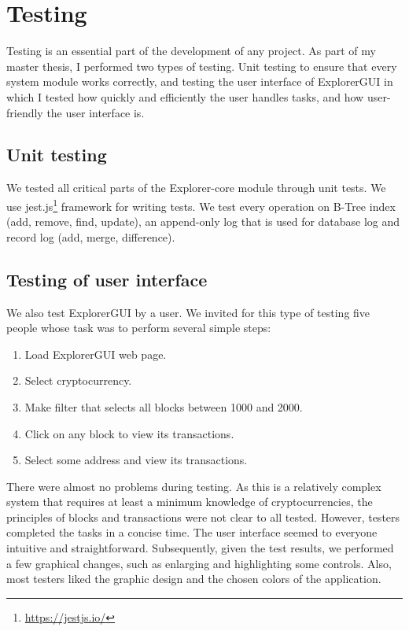 \chapter{Testing}
Testing is an essential part of the development of any project. As part of my master thesis, I performed two types of testing. Unit testing to ensure that every system module works correctly, and testing the user interface of ExplorerGUI in which I tested how quickly and efficiently the user handles tasks, and how user-friendly the user interface is.

\section{Unit testing}
We tested all critical parts of the Explorer-core module through unit tests. We use jest.js\footnote{\url{https://jestjs.io/}} framework for writing tests. We test every operation on B-Tree index (add, remove, find, update), an append-only log that is used for database log and record log (add, merge, difference).


\section{Testing of user interface}
We also test ExplorerGUI by a user. We invited for this type of testing five people whose task was to perform several simple steps:
\begin{enumerate}
    \item Load ExplorerGUI web page.
    \item Select cryptocurrency.
    \item Make filter that selects all blocks between 1000 and 2000.
    \item Click on any block to view its transactions.
    \item Select some address and view its transactions.
\end{enumerate}
There were almost no problems during testing. As this is a relatively complex system that requires at least a minimum knowledge of cryptocurrencies, the principles of blocks and transactions were not clear to all tested. However, testers completed the tasks in a concise time. The user interface seemed to everyone intuitive and straightforward. Subsequently, given the test results, we performed a few graphical changes, such as enlarging and highlighting some controls. Also, most testers liked the graphic design and the chosen colors of the application.